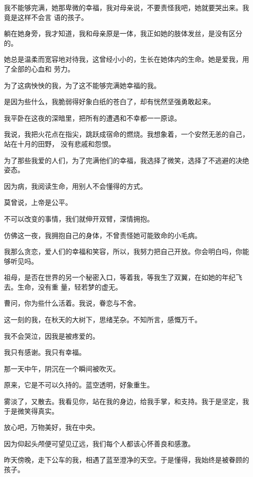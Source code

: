 		我不能够完满，她那卑微的幸福，我对母亲说，不要责怪我吧，她就要哭出来。我竟是这样不会言
	语的孩子。

		躺在她身旁，我才知道，我和母亲原是一体，我正如她的肢体发丝，是没有区分的。

		她总是温柔而宽容地对待我，这曾经小小的，生长在她体内的生命。她是爱我，用了全部的心血和
	劳力。

		为了这病怏怏的我，为了这不能够完满她幸福的我。


		是因为些什么，我脆弱得好象白纸的苍白了，却有恍然坚强勇敢起来。

		我平卧在这夜的深暗里，把所有的遭遇和不幸都一一原谅。


		我说，我把火花点在指尖，跳跃成宿命的燃烧。我想象着，一个安然无恙的自己，站在十月的田野，
	没有悲戚和怨恨。

		为了那些我爱的人们，为了完满他们的幸福，我选择了微笑，选择了不逃避的决绝姿态。


		因为病，我阅读生命，用别人不会懂得的方式。

		莫曾说，上帝是公平。


		不可以改变的事情，我们就伸开双臂，深情拥抱。

		仿佛这一夜，我拥抱自己的身体，不曾责怪她可能致命的小毛病。

		我那么贪恋，爱人们的幸福和笑容，所以，我努力把自己开放。你会明白吗，你能够听见吗。

		祖母，是否在世界的另一个秘密入口，等着我，等我生了双翼，在如她的年纪飞去。生命，没有重
	量，轻若梦的虚无。


		曹问，你为些什么活着。我说，眷恋与不舍。

		这一刻的我，在秋天的大树下，思绪芜杂。不知所言，感慨万千。

		我不会哭泣，因我是被疼爱的。

		我只有感谢。我只有幸福。


		那一天中午，阴沉在一个瞬间被吹灭。

		原来，它是不可以久持的。蓝空透明，好象重生。

		雾淡了，又散去。我看见你，站在我的身边，给我手掌，和支持。我于是坚定，我于是微笑得真实。


		放心吧，万物美好，我在中央。

	\endwriting



		因为仰起头颅便可望见辽远，我们每个人都该心怀善良和感激。


		昨天傍晚，走下公车的我，相遇了蓝至澄净的天空。于是懂得，我始终是被眷顾的孩子。

